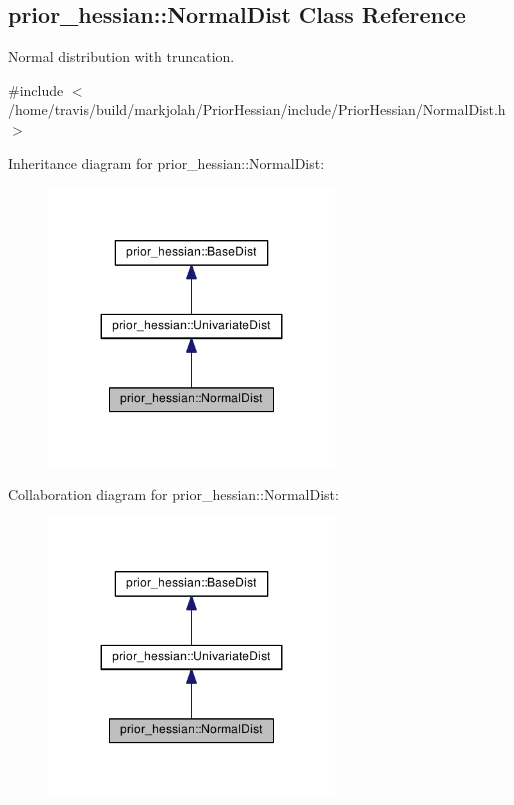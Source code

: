 \hypertarget{classprior__hessian_1_1NormalDist}{}\subsection{prior\+\_\+hessian\+:\+:Normal\+Dist Class Reference}
\label{classprior__hessian_1_1NormalDist}


Normal distribution with truncation.  




{\ttfamily \#include $<$/home/travis/build/markjolah/\+Prior\+Hessian/include/\+Prior\+Hessian/\+Normal\+Dist.\+h$>$}



Inheritance diagram for prior\+\_\+hessian\+:\+:Normal\+Dist\+:\nopagebreak
\begin{figure}[H]
\begin{center}
\leavevmode
\includegraphics[width=215pt]{classprior__hessian_1_1NormalDist__inherit__graph}
\end{center}
\end{figure}


Collaboration diagram for prior\+\_\+hessian\+:\+:Normal\+Dist\+:\nopagebreak
\begin{figure}[H]
\begin{center}
\leavevmode
\includegraphics[width=215pt]{classprior__hessian_1_1NormalDist__coll__graph}
\end{center}
\end{figure}
